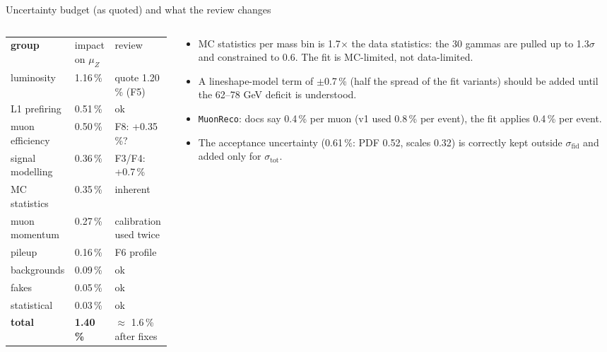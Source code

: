 \documentclass[aspectratio=169,9pt,t]{beamer}
\newcommand{\thead}{\rowcolor{primary}\color{bg}\bfseries}
\newcommand{\tsize}{\scriptsize}
\newcommand{\muZ}{\mu_{Z}}
\newcommand{\sfid}{\sigma_{\mathrm{fid}}}
\begin{document}
\begin{frame}{Uncertainty budget (as quoted) and what the review changes}
  \tsize
  \begin{columns}[T]
    \begin{column}{0.5\textwidth}
      \begin{tabular}{L{3.0cm}R{1.5cm}L{2.2cm}}
        \thead group & impact on $\muZ$ & review\\
         luminosity & 1.16\,\% & quote 1.20\,\% (F5)\\
         L1 prefiring & 0.51\,\% & ok\\
         muon efficiency & 0.50\,\% & F8: +0.35\,\%?\\
         signal modelling & 0.36\,\% & F3/F4: +0.7\,\%\\
         MC statistics & 0.35\,\% & inherent\\
         muon momentum & 0.27\,\% & calibration used twice\\
         pileup & 0.16\,\% & F6 profile\\
         backgrounds & 0.09\,\% & ok\\
         fakes & 0.05\,\% & ok\\
         statistical & 0.03\,\% & ok\\
         \textbf{total} & \textbf{1.40\,\%} & $\approx$ 1.6\,\% after fixes\\
      \end{tabular}
    \end{column}
    \begin{column}{0.48\textwidth}\small
      \begin{itemize}
        \item MC statistics per mass bin is 1.7$\times$ the data statistics: the 30 gammas are pulled up to 1.3$\sigma$ and constrained to 0.6. The fit is MC-limited, not data-limited.
        \item A lineshape-model term of $\pm$0.7\,\% (half the spread of the fit variants) should be added until the 62--78 GeV deficit is understood.
        \item \texttt{MuonReco}: docs say 0.4\,\% per muon (v1 used 0.8\,\% per event), the fit applies 0.4\,\% per event.
        \item The acceptance uncertainty (0.61\,\%: PDF 0.52, scales 0.32) is correctly kept outside $\sfid$ and added only for $\sigma_{\mathrm{tot}}$.
      \end{itemize}
    \end{column}
  \end{columns}
\end{frame}
\end{document}
